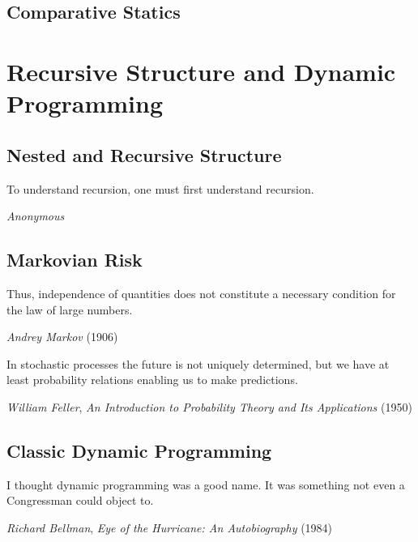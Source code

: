 \documentclass[12pt,openany]{book}
\begin{document}




\chapter{Comparative Statics}
\label{ch:comparative-statics}





\part{Recursive Structure and Dynamic Programming}

\label{part:recursive}

\chapter{Nested and Recursive Structure}

\epigraph{To understand recursion, one must first understand recursion.}{\textit{Anonymous}}





\chapter{Markovian Risk}

\epigraph{Thus, independence of quantities does not constitute a necessary condition for the law of large numbers.}{\textit{Andrey Markov} (1906)}

\epigraph{In stochastic processes the future is not uniquely determined, but we have at least probability relations enabling us to make predictions.}{\textit{William Feller}, \textit{An Introduction to Probability Theory and Its Applications} (1950)}



\chapter{Classic Dynamic Programming}

\epigraph{I thought dynamic programming was a good name. It was something not even a Congressman could object to.}{\textit{Richard Bellman}, \textit{Eye of the Hurricane: An Autobiography} (1984)}
\end{document}
